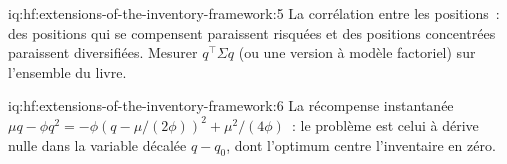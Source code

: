 \begin{solution}{iq:hf:extensions-of-the-inventory-framework:5}
La corrélation entre les positions~: des positions qui se compensent paraissent risquées et des positions concentrées paraissent diversifiées. Mesurer $q^\top\Sigma q$ (ou une
version à modèle factoriel) sur l'ensemble du livre.
\end{solution}

\begin{solution}{iq:hf:extensions-of-the-inventory-framework:6}
La récompense instantanée $\mu q-\phi q^2=-\phi(q-\mu/(2\phi))^2+\mu^2/(4\phi)$~: le problème est celui à dérive nulle dans la variable décalée $q-q_0$, dont
l'optimum centre l'inventaire en zéro.
\end{solution}
